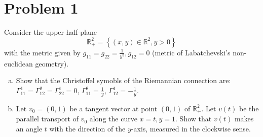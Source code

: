 \documentclass[a4paper]{article}
\begin{document}
\section*{Problem 1}%
Consider the upper half-plane 
\[
  \mathds{R}^2_+ = \left\{ (x,y) \in \mathds{R}^2, y > 0 \right\}
\]
with the metric given by $g_{11} = g_{22} = \frac{1}{y^2}, g_{12} = 0$ (metric of Labatchevski's non-euclidean geometry).

\begin{enumerate}[(a)]
  \item Show that the Christoffel symobls of the Riemannian connection are: $ \Gamma_{11}^1 =\Gamma_{12}^2 = \Gamma_{22}^1 = 0 $, $\Gamma_{11}^2 = \frac{1}{y}$, $\Gamma_{12}^1 = - \frac{1}{y}$.
  \item Let $v_0 = (0,1)$ be a tangent vector at point $(0,1)$ of $\mathds{R}^2_+$. Let $v(t)$ be the parallel transport of $v_0$ along the curve $x = t, y=1$. Show that $v(t)$ makes an angle $t$ with the direction of the $y$-axis, measured in the clockwise sense.
\end{enumerate}
\end{document}
